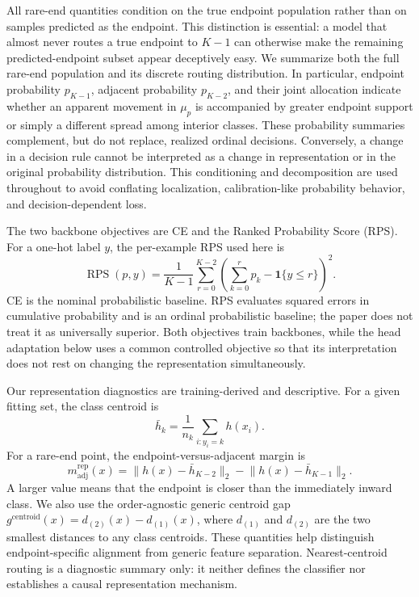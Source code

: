 All rare-end quantities condition on the true endpoint population rather than
on samples predicted as the endpoint. This distinction is essential: a model
that almost never routes a true endpoint to \(K-1\) can otherwise make the
remaining predicted-endpoint subset appear deceptively easy. We summarize both
the full rare-end population and its discrete routing distribution. In
particular, endpoint probability \(p_{K-1}\), adjacent probability
\(p_{K-2}\), and their joint allocation indicate whether an apparent movement
in \(\mu_p\) is accompanied by greater endpoint support or simply a different
spread among interior classes. These probability summaries complement, but do
not replace, realized ordinal decisions. Conversely, a change in a decision
rule cannot be interpreted as a change in representation or in the original
probability distribution. This conditioning and decomposition are used
throughout to avoid conflating localization, calibration-like probability
behavior, and decision-dependent loss.

The two backbone objectives are CE and the Ranked Probability Score (RPS). For
a one-hot label \(y\), the per-example RPS used here is
\[
\operatorname{RPS}(p,y)=\frac{1}{K-1}\sum_{r=0}^{K-2}
\left(\sum_{k=0}^{r}p_k-\mathbf{1}\{y\leq r\}\right)^2.
\]
CE is the nominal probabilistic baseline. RPS evaluates squared errors in
cumulative probability and is an ordinal probabilistic baseline; the paper
does not treat it as universally superior. Both objectives train backbones,
while the head adaptation below uses a common controlled objective so that its
interpretation does not rest on changing the representation simultaneously.

Our representation diagnostics are training-derived and descriptive. For a
given fitting set, the class centroid is
\[\bar h_k=\frac{1}{n_k}\sum_{i:y_i=k} h(x_i).\]
For a rare-end point, the endpoint-versus-adjacent margin is
\[
m_{\mathrm{adj}}^{\mathrm{rep}}(x)=
\lVert h(x)-\bar h_{K-2}\rVert_2-
\lVert h(x)-\bar h_{K-1}\rVert_2.
\]
A larger value means that the endpoint is closer than the immediately inward
class. We also use the order-agnostic generic centroid gap
\(g^{\mathrm{centroid}}(x)=d_{(2)}(x)-d_{(1)}(x)\), where \(d_{(1)}\) and
\(d_{(2)}\) are the two smallest distances to any class centroids. These
quantities help distinguish endpoint-specific alignment from generic feature
separation. Nearest-centroid routing is a diagnostic summary only: it neither
defines the classifier nor establishes a causal representation mechanism.

